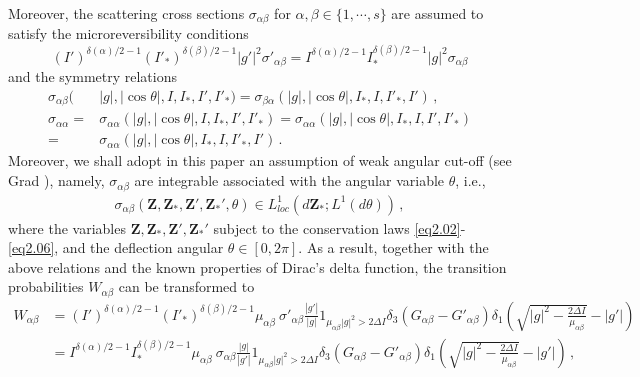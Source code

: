 \documentclass[reqno,11pt]{amsart}
\numberwithin{equation}{section}
\begin{document}
Moreover, the scattering cross sections $\sigma_{\alpha \beta } $ for $ \alpha, \beta \in \{ 1,\cdots , s\}$ are assumed to satisfy the microreversibility conditions
\begin{equation}\label{eq2.11}
	(I')^{\delta(\alpha)/2-1} (I'_*)^{\delta(\beta)/2-1} |g'|^2 \sigma'_{\alpha \beta } 
	= I^{\delta(\alpha)/2-1} I_*^{\delta(\beta)/2-1} |g|^2 \sigma_{\alpha \beta }
\end{equation}
and the symmetry relations
\begin{equation}\label{eq2.12}
    \begin{aligned}
        \sigma_{\alpha \beta } (&|g|,|\cos \theta |, I , I_* , I' ,I'_*) =\sigma_{\beta \alpha }(|g|,|\cos \theta |, I_*, I  ,I'_*, I' ) \,, \\
        \sigma_{\alpha \alpha} = & \sigma_{\alpha \alpha} (|g|,|\cos \theta |, I , I_* , I' ,I'_*) = \sigma_{\alpha \alpha} (|g|,|\cos \theta |, I_* , I , I' ,I'_*) \\
        = & \sigma_{\alpha \alpha} (|g|,|\cos \theta |, I_* , I , I'_* ,I') \,.
    \end{aligned}
\end{equation}
Moreover, we shall adopt in this paper an assumption of weak angular cut-off (see Grad \cite{Grad-cut-off}), namely, $\sigma_{\alpha \beta }$ are integrable associated with the angular variable $\theta$, i.e.,
\begin{equation}\label{Asum-angular-cutoff}
    \begin{aligned}
        \sigma_{\alpha \beta} (\mathbf{Z}, \mathbf{Z}_*, \mathbf{Z}', \mathbf{Z}_*', \theta) \in L^1_{loc} ( d \mathbf{Z}_*;  L^1 (d \theta) ) \,,
    \end{aligned}
\end{equation}
where the variables $\mathbf{Z}, \mathbf{Z}_*, \mathbf{Z}', \mathbf{Z}_*'$ subject to the conservation laws \eqref{eq2.02}-\eqref{eq2.06}, and the deflection angular $\theta \in [0, 2 \pi]$. As a result, together with the above relations and the known properties of Dirac’s delta function, the transition probabilities $W_{\alpha \beta }$ can be transformed to
\begin{equation*}
	\begin{aligned}
		W_{\alpha \beta } 
		&= (I')^{\delta(\alpha)/2-1} (I'_*)^{\delta(\beta )/2-1} \mu_{\alpha \beta } \ \sigma'_{\alpha \beta } \tfrac{|g'|}{|g|} 1_{\mu _{\alpha \beta }|g|^2>2\Delta I} \delta_{3} (G_{\alpha \beta }- G'_{\alpha \beta }) \delta_{1} (\sqrt{|g|^2-\tfrac{2\Delta I}{\mu_{\alpha \beta } }}-|g'|)\\
		&=I^{\delta(\alpha)/2-1} I_*^{\delta(\beta )/2-1} \mu_{\alpha \beta } \ \sigma_{\alpha \beta }\tfrac{|g|}{|g'|} 1_{\mu _{\alpha \beta }|g|^2>2\Delta I} \delta_{3} (G_{\alpha \beta }- G'_{\alpha \beta }) \delta_{1} (\sqrt{|g|^2-\tfrac{2\Delta I}{\mu_{\alpha \beta } }}-|g'|) \,,
	\end{aligned}
\end{equation*}
\end{document}
